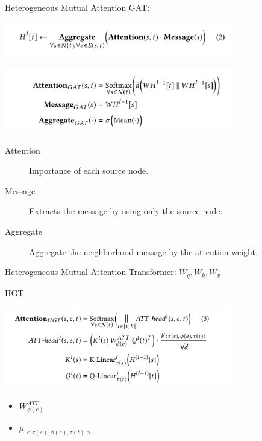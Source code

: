 \documentclass[aspectratio=1610,hyperref={colorlinks,unicode,linkcolor=blue,anchorcolor=blue,citecolor=blue,filecolor=black,urlcolor=blue}]{beamer}
\begin{document}
\begin{frame}[label={sec:org77e49dd}]{Heterogeneous Mutual Attention}
GAT:

\begin{center}
\includegraphics[width=10cm]{./p3-1.png}
\end{center}
\begin{center}
\includegraphics[width=10cm]{./p3-2.png}
\end{center}

\begin{description}
\item[{Attention}] Importance of each source node.
\item[{Message}] Extracts the message by using only the source node.
\item[{Aggregate}] Aggregate the neighborhood message by the attention weight.
\end{description}
\end{frame}

\begin{frame}[label={sec:org06bd389}]{Heterogeneous Mutual Attention}
Transformer:  \(W_q,W_k,W_v\)

HGT:
\begin{center}
\includegraphics[width=10cm]{./p4.png}
\end{center}

\begin{itemize}
\item \(W^{ATT}_{\phi(e)}\)
\item \(\mu_{<\tau(s),\phi(e),\tau(t)>}\)
\end{itemize}
\end{frame}
\end{document}
